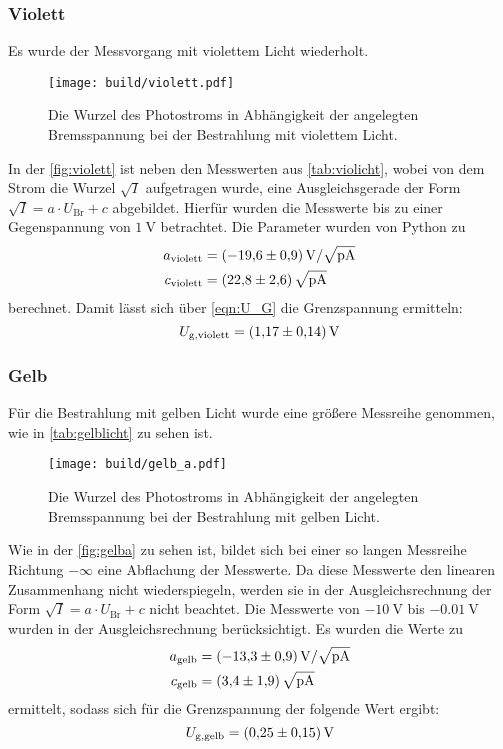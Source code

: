 \subsubsection{Violett}
Es wurde der Messvorgang mit violettem Licht wiederholt.
\begin{figure}
  \texttt{[image: build/violett.pdf]}
  \caption{Die Wurzel des Photostroms in Abhängigkeit der angelegten Bremsspannung bei der Bestrahlung mit violettem Licht.}
  \label{fig:violett}
\end{figure}
\noindent
In der \autoref{fig:violett} ist neben den Messwerten aus \autoref{tab:violicht}, wobei von dem Strom die Wurzel $\sqrt{I}$ aufgetragen wurde, 
eine Ausgleichsgerade der Form $\sqrt{I} = a \cdot U_{\text{Br}} + c $ abgebildet.
Hierfür wurden die Messwerte bis zu einer Gegenspannung von $\SI{1}{\volt}$ betrachtet.
Die Parameter wurden von Python zu
\begin{align*}
  a_{\text{violett}} &= \SI{-19.6\pm 0.9}{\volt\per\sqrt{\pico\ampere}}\\
  c_{\text{violett}} &= \SI{22.8 \pm 2.6}{\sqrt{\pico\ampere}}
\end{align*}
berechnet.
Damit lässt sich über \eqref{eqn:U_G} die Grenzspannung ermitteln:
\begin{equation*}
  U_{\text{g},\text{violett}} = \SI{1.17 \pm 0.14}{\volt}
\end{equation*}

\subsubsection{Gelb}
Für die Bestrahlung mit gelben Licht wurde eine größere Messreihe genommen, wie in \autoref{tab:gelblicht} zu sehen ist.
\begin{figure}[H]
  \texttt{[image: build/gelb\_a.pdf]}
  \caption{Die Wurzel des Photostroms in Abhängigkeit der angelegten Bremsspannung bei der Bestrahlung mit gelben Licht.}
  \label{fig:gelba}
\end{figure}
\noindent
Wie in der \autoref{fig:gelba} zu sehen ist, bildet sich bei einer so langen Messreihe Richtung $-\infty$ eine Abflachung der Messwerte.
Da diese Messwerte den linearen Zusammenhang nicht wiederspiegeln, werden sie in der Ausgleichsrechnung der Form $\sqrt{I} = a \cdot U_{\text{Br}} + c $ nicht beachtet.
Die Messwerte von $\SI{-10}{\volt}$ bis $\SI{-0.01}{\volt}$ wurden in der Ausgleichsrechnung berücksichtigt.
Es wurden die Werte zu 
\begin{align*}
  a_{\text{gelb}} &= \SI{-13.3 \pm 0.9}{\volt\per\sqrt{\pico\ampere}}\\
  c_{\text{gelb}} &= \SI{3.4 \pm 1.9}{\sqrt{\pico\ampere}}
\end{align*}
ermittelt, sodass sich für die Grenzspannung der folgende Wert ergibt:
\begin{equation*}
  U_{\text{g},\text{gelb}} = \SI{0.25 \pm 0.15}{\volt}
\end{equation*}

